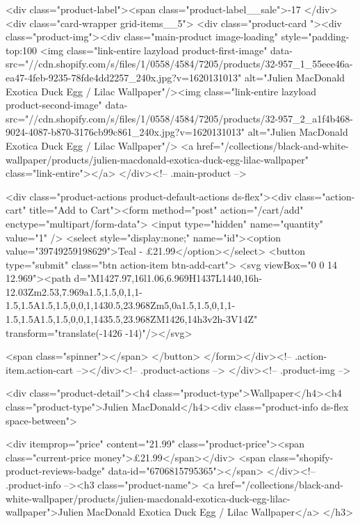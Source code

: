 {{{{{{{<div class="product-label"><span class="product-label__sale">-17%
          </div><div class="card-wrapper grid-items__5">
            <div class="product-card "><div class="product-img"><div class="main-product image-loading" style="padding-top:100%
      <img class="link-entire lazyload product-first-image" data-src="//cdn.shopify.com/s/files/1/0558/4584/7205/products/32-957_1_55eee46a-ea47-4feb-9235-78fde4dd2257_240x.jpg?v=1620131013" alt="Julien MacDonald Exotica Duck Egg / Lilac Wallpaper"/><img class="link-entire lazyload product-second-image" data-src="//cdn.shopify.com/s/files/1/0558/4584/7205/products/32-957_2_a1f4b468-9024-4087-b870-3176cb99c861_240x.jpg?v=1620131013" alt="Julien MacDonald Exotica Duck Egg / Lilac Wallpaper"/>
      <a href="/collections/black-and-white-wallpaper/products/julien-macdonald-exotica-duck-egg-lilac-wallpaper" class="link-entire"></a>
    </div><!-- .main-product -->
  
<div class="product-actions product-default-actions ds-flex"><div class="action-cart" title="Add to Cart"><form method="post" action="/cart/add" enctype="multipart/form-data">
            <input type="hidden" name="quantity" value="1" />
            <select style="display:none;" name="id"><option value="39749259198629">Teal - £21.99</option></select>
            <button type="submit" class="btn action-item btn-add-cart">
              <svg viewBox="0 0 14 12.969"><path d="M1427.97,16l1.06,6.969H1437L1440,16h-12.03Zm2.53,7.969a1.5,1.5,0,1,1-1.5,1.5A1.5,1.5,0,0,1,1430.5,23.968Zm5,0a1.5,1.5,0,1,1-1.5,1.5A1.5,1.5,0,0,1,1435.5,23.968ZM1426,14h3v2h-3V14Z" transform="translate(-1426 -14)"/></svg>

              <span class="spinner"></span>
            </button>
          </form></div><!-- .action-item.action-cart --></div><!-- .product-actions -->
</div><!-- .product-img -->

<div class="product-detail"><h4 class="product-type">Wallpaper</h4><h4 class="product-type">Julien MacDonald</h4><div class="product-info ds-flex space-between">
    
<div itemprop="price" content="21.99" class="product-price"><span class="current-price money">£21.99</span></div>
    <span class="shopify-product-reviews-badge" data-id="6706815795365"></span>
  </div><!-- .product-info --><h3 class="product-name">
      <a href="/collections/black-and-white-wallpaper/products/julien-macdonald-exotica-duck-egg-lilac-wallpaper">Julien MacDonald Exotica Duck Egg / Lilac Wallpaper</a>
    </h3>
    
}}}}}}}
